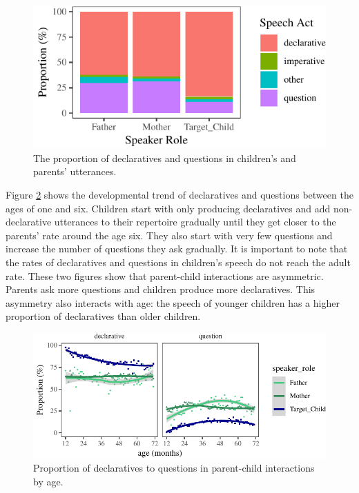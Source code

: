 \documentclass[floatsintext,man]{apa6}
\theoremstyle{definition}
\theoremstyle{definition}
\theoremstyle{definition}
\theoremstyle{remark}
\begin{document}
\begin{figure}[tb]

{\centering \includegraphics{figs/totalUtteranceTypePlot-1} 

}

\caption{The proportion of declaratives and questions in children's and parents' utterances.}\label{fig:totalUtteranceTypePlot}
\end{figure}

Figure \ref{fig:utteranceTypeByAgePlot} shows the developmental trend of
declaratives and questions between the ages of one and six. Children
start with only producing declaratives and add non-declarative
utterances to their repertoire gradually until they get closer to the
parents' rate around the age six. They also start with very few
questions and increase the number of questions they ask gradually. It is
important to note that the rates of declaratives and questions in
children's speech do not reach the adult rate. These two figures show
that parent-child interactions are asymmetric. Parents ask more
questions and children produce more declaratives. This asymmetry also
interacts with age: the speech of younger children has a higher
proportion of declaratives than older children.

\begin{figure}
\centering
\includegraphics{figs/utteranceTypeByAgePlot-1.pdf}
\caption{\label{fig:utteranceTypeByAgePlot}Proportion of declaratives to
questions in parent-child interactions by age.}
\end{figure}
\end{document}
